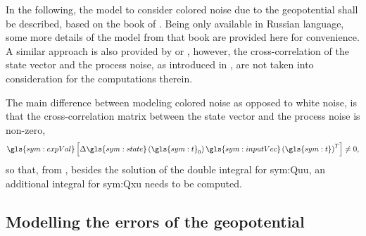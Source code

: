 In the following, the model to consider colored noise due to the geopotential shall be described, based on the book of \cite{nazarenko2010}. Being only available in Russian
language, some more details of the model from that book are provided here for convenience. A similar approach is also provided by \cite{wright1981} or \cite{wright2008}, however,
the cross-correlation of the state vector and the process noise, as introduced in , are not taken into consideration for the
computations therein.

The main difference between modeling colored noise as opposed to white noise, is that the cross-correlation matrix between the state vector and the process noise is non-zero,
\begin{equation}
 \gls{sym:expVal}\left[\Delta \gls{sym:state}\left(\gls{sym:t}_0\right) \gls{sym:inputVec}\left(\gls{sym:t}\right)^T\right] \neq 0,
\end{equation}
so that, from , besides the solution of the double integral for \gls{sym:Quu}, an additional integral for \gls{sym:Qxu} needs to be computed.

\subsection{Modelling the errors of the geopotential}

